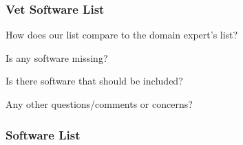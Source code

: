 \documentclass[t,12pt,numbers,fleqn]{beamer}
\begin{document}

\begin{frame}
\frametitle{Vet Software List}

\bi
\item How does our list compare to the domain expert's list?
\item Is any software missing?
\item Is there software that should be included?
\item Any other questions/comments or concerns?  
\ei
  
\end{frame}


\begin{frame}
\frametitle{Software List}


\end{frame}
\end{document}
